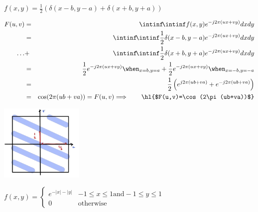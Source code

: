 \begin{qsolve}
	\begin{latin}
		\textbullet $f(x,y)=\frac{1}{2}\left(\delta(x-b,y-a)+\delta(x+b,y+a)\right)$
	\end{latin}
	\begin{qsolve}[]
		\begin{eqnarray*}
			F(u,v)&=&\intinf\!\intinf f(x,y)e^{-j2\pi(ux+vy)}dxdy\\
			&=&\intinf\!\intinf\frac{1}{2}\delta(x-b,y-a)e^{-j2\pi(ux+vy)}dxdy\\
			\dots&+&\intinf\!\intinf\frac{1}{2}\delta(x+b,y+a)e^{-j2\pi(ux+vy)}dxdy\\
			&=&\frac{1}{2}e^{-j2\pi(ux+vy)}\when_{x=b,y=a}+\frac{1}{2}e^{-j2\pi(ux+vy)}\when_{x=-b,y=-a}\\
			&=&
			\frac{1}{2}\left(e^{j2\pi(ub+va)}+e^{-j2\pi(ub+va)}\right)\\
			&=&\cos(2\pi(ub+va))=F(u,v)\Longrightarrow\qquad\text{\hl{$F(u,v)=\cos(2\pi(ub+va))$}}
		\end{eqnarray*}
		\begin{center}
			\includegraphics[width=4cm]{pics/q4_2_1.png}
		\end{center}
	\end{qsolve}


	\begin{latin}
		\textbullet $f(x,y)=\begin{cases}
				e^{-|x|-|y|} & -1\leq x\leq 1 \text{and} -1\leq y\leq 1 \\
				0            & \text{otherwise}
			\end{cases}$
	\end{latin}


\end{qsolve}
